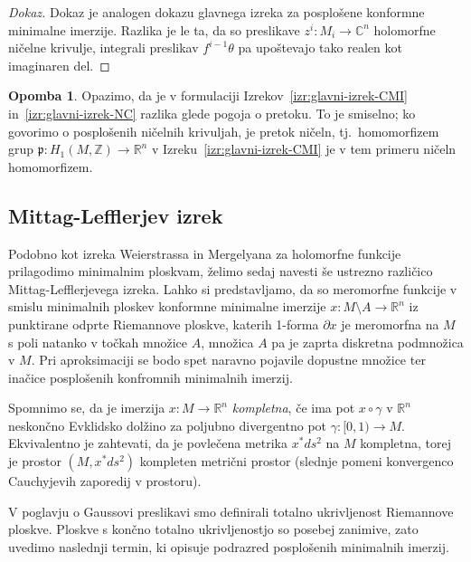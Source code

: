 \documentclass[12pt,a4paper,twoside]{article}
\theoremstyle{definition} %
\newtheorem{opomba}[definicija]{Opomba}
\newenvironment{dokaz}[1][Dokaz]{\begin{proof}[#1]}{\end{proof}}
\theoremstyle{plain} %
\numberwithin{equation}{section}  %
\newcommand{\R}{\mathbb R}
\begin{document}
\begin{dokaz}
Dokaz je analogen dokazu glavnega izreka za posplošene konformne minimalne imerzije. Razlika je le ta, da so preslikave $z^{i} \colon M_{i} \to \mathbb{C}^{n}$ holomorfne ničelne krivulje, integrali preslikav $f^{i-1} \theta$ pa upoštevajo tako realen kot imaginaren del. 
\end{dokaz}

\begin{opomba}
Opazimo, da je v formulaciji Izrekov~\ref{izr:glavni-izrek-CMI} in~\ref{izr:glavni-izrek-NC} razlika glede pogoja o pretoku. To je smiselno; ko govorimo o posplošenih ničelnih krivuljah, je pretok ničeln, tj.~homomorfizem grup $\mathfrak{p} \colon H_{1}(M, \mathbb{Z}) \to \mathbb{R}^{n}$ v Izreku~\ref{izr:glavni-izrek-CMI} je v tem primeru ničeln homomorfizem.
\end{opomba}

\subsection{Mittag-Lefflerjev izrek}
%
Podobno kot izreka Weierstrassa in Mergelyana za holomorfne funkcije prilagodimo minimalnim ploskvam, želimo sedaj navesti še ustrezno različico Mittag-Lefflerjevega izreka. Lahko si predstavljamo, da so meromorfne funkcije v smislu minimalnih ploskev konformne minimalne imerzije $x \colon M \setminus A \to \R^{n}$ iz punktirane odprte Riemannove ploskve, katerih 1-forma $\partial x$ je meromorfna na $M$ s poli natanko v točkah množice $A$, množica $A$ pa je zaprta diskretna podmnožica v $M$.
Pri aproksimaciji se bodo spet naravno pojavile dopustne množice ter inačice posplošenih konfromnih minimalnih imerzij.

Spomnimo se, da je imerzija $x \colon M \to \R^{n}$ \emph{kompletna}, če ima pot $x \circ \gamma$ v $\R^{n}$ neskončno Evklidsko dolžino za poljubno divergentno pot $\gamma \colon [0,1) \to M$.
Ekvivalentno je zahtevati, da je povlečena metrika $x^{*}ds^2$ na $M$ kompletna, torej je prostor $(M, x^{*}ds^2)$ kompleten metrični prostor (slednje pomeni konvergenco Cauchyjevih zaporedij v prostoru).

V poglavju o Gaussovi preslikavi smo definirali totalno ukrivljenost Riemannove ploskve. Ploskve s končno totalno ukrivljenostjo so posebej zanimive, zato uvedimo naslednji termin, ki opisuje podrazred posplošenih minimalnih imerzij.
\end{document}
